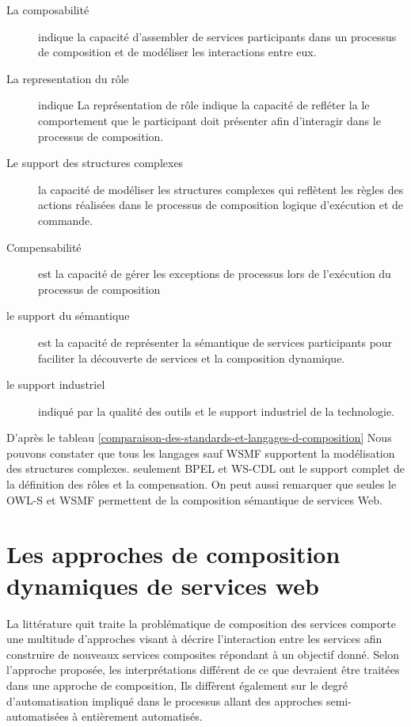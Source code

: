   \renewcommand{\descriptionlabel}[1]{\hspace{0.5cm}\textbullet~\textsf{#1}}
  \begin{description}
  \item [La composabilité] indique la capacité d'assembler de services
    participants dans un processus de composition et de modéliser les
    interactions entre eux.

  \item [La representation du rôle] indique La représentation de rôle
    indique la capacité de refléter la le comportement que le
    participant doit présenter afin d'interagir dans le processus de
    composition.

  \item [Le support des structures complexes] la capacité de modéliser
    les structures complexes qui reflètent les règles des actions
    réalisées dans le processus de composition logique d'exécution et
    de commande.

  \item [Compensabilité] est la capacité de gérer les exceptions de
    processus lors de l'exécution du processus de composition

  \item [le support du sémantique] est la capacité de représenter la
    sémantique de services participants pour faciliter la découverte
    de services et la composition dynamique.

  \item [le support industriel] indiqué par la qualité des outils et
    le support industriel de la technologie.
  \end{description}
  \enddescription

  D'après le tableau
  \ref{comparaison-des-standards-et-langages-d-composition} Nous
  pouvons constater que tous les langages sauf \textsc{WSMF}
  supportent la modélisation des structures complexes. seulement
  \textsc{BPEL} et \textsc{WS-CDL} ont le support complet de la
  définition des rôles et la compensation. On peut aussi remarquer que
  seules le \textsc{OWL-S} et \textsc{WSMF} permettent de la
  composition sémantique de services Web.

  \section{Les approches de composition dynamiques de services web}
  \label{sec:comp-dynam}

  La littérature quit traite la problématique de composition des
  services comporte une multitude d'approches visant à décrire
  l'interaction entre les services afin construire de nouveaux
  services composites répondant à un objectif donné. Selon l'approche
  proposée, les interprétations différent de ce que devraient être
  traitées dans une approche de composition, Ils diffèrent également
  sur le degré d'automatisation impliqué dans le processus allant des
  approches semi-automatisées à entièrement automatisés.\medskip

